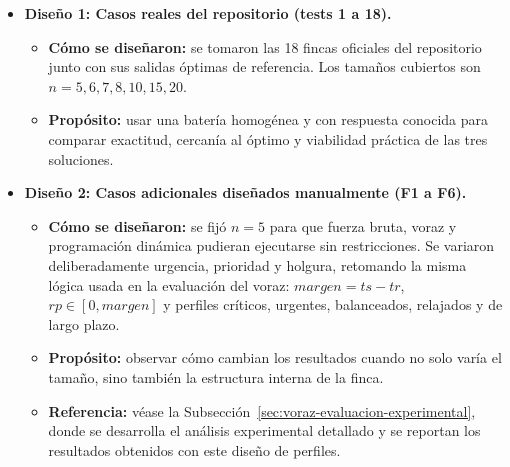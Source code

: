 \documentclass[12pt,a4paper]{article}
\begin{document}
\begin{itemize}
  \item \textbf{Dise\~no 1: Casos reales del repositorio (tests 1 a 18).}
  \begin{itemize}
    \item \textbf{C\'omo se dise\~naron:} se tomaron las 18 fincas oficiales del repositorio junto con sus salidas \'optimas de referencia. Los tama\~nos cubiertos son \(n=5,6,7,8,10,15,20\).
    \item \textbf{Prop\'osito:} usar una bater\'ia homog\'enea y con respuesta conocida para comparar exactitud, cercan\'ia al \'optimo y viabilidad pr\'actica de las tres soluciones.
  \end{itemize}

  \item \textbf{Dise\~no 2: Casos adicionales dise\~nados manualmente (F1 a F6).}
  \begin{itemize}
    \item \textbf{C\'omo se dise\~naron:} se fij\'o \(n=5\) para que fuerza bruta, voraz y programaci\'on din\'amica pudieran ejecutarse sin restricciones. Se variaron deliberadamente urgencia, prioridad y holgura, retomando la misma l\'ogica usada en la evaluaci\'on del voraz: \(margen=ts-tr\), \(rp \in [0,margen]\) y perfiles cr\'iticos, urgentes, balanceados, relajados y de largo plazo.
    \item \textbf{Prop\'osito:} observar c\'omo cambian los resultados cuando no solo var\'ia el tama\~no, sino tambi\'en la estructura interna de la finca.
    \item \textbf{Referencia:} v\'ease la Subsecci\'on~\ref{sec:voraz-evaluacion-experimental}, donde se desarrolla el an\'alisis experimental detallado y se reportan los resultados obtenidos con este dise\~no de perfiles.
  \end{itemize}


\end{itemize}
\end{document}
